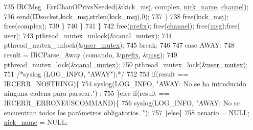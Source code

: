 \begin{DoxyCode}
{{{{{{{{{{735                                                         IRCMsg\_ErrChanOPrivsNeeded(&kick\_msj, complex, 
      \hyperlink{_g-2361-06-_p1-_server_8c_aabbf66718cda228b924a4a9441eadf62}{nick\_name}, \hyperlink{_g-2361-06-_p1-_server_8c_a842ca2f026578e5c479c095ff3335969}{channel});
736                                                         send(IDsocket,kick\_msj,strlen(kick\_msj),0);
737                                                 \}
738                                                 free(kick\_msj); free(complex);
739                                         \}
740                                 \}
741                         \}
742                         free(\hyperlink{_g-2361-06-_p1-_server_8c_ad2849cf781a4db22cc1b31eaaee50a4f}{prefix}); free(\hyperlink{_g-2361-06-_p1-_server_8c_a842ca2f026578e5c479c095ff3335969}{channel}); free(\hyperlink{_g-2361-06-_p1-_server_8c_a32d2f5216cddb59c7cc8fb2806a7e727}{msg});free(
      \hyperlink{_g-2361-06-_p1-_server_8c_a14871705f45ccdc5bb9f4549efd8e119}{user});
743                         pthread\_mutex\_unlock(&\hyperlink{_g-2361-06-_p1-_server_8c_ab86a544a49de18195048bac54dd3ac3e}{canal\_mutex});
744                         pthread\_mutex\_unlock(&\hyperlink{_g-2361-06-_p1-_server_8c_a5dedd07a1144d2ab70b74a8e64b6a7c0}{user\_mutex});
745                         \textcolor{keywordflow}{break};
746 
747                 \textcolor{keywordflow}{case} AWAY:
748                         result = IRCParse\_Away (comando, &\hyperlink{_g-2361-06-_p1-_server_8c_ad2849cf781a4db22cc1b31eaaee50a4f}{prefix}, &\hyperlink{_g-2361-06-_p1-_server_8c_a32d2f5216cddb59c7cc8fb2806a7e727}{msg});
749                         pthread\_mutex\_lock(&\hyperlink{_g-2361-06-_p1-_server_8c_ab86a544a49de18195048bac54dd3ac3e}{canal\_mutex});
750                         pthread\_mutex\_lock(&\hyperlink{_g-2361-06-_p1-_server_8c_a5dedd07a1144d2ab70b74a8e64b6a7c0}{user\_mutex});
751                         \textcolor{comment}{/*syslog (LOG\_INFO, "AWAY");*/}
752 
753                         \textcolor{keywordflow}{if}(result == IRCERR\_NOSTRING)\{
754                                 syslog(LOG\_INFO, \textcolor{stringliteral}{"AWAY: No se ha introducido ninguna cadena para parsear."})
      ;
755                         \}\textcolor{keywordflow}{else} \textcolor{keywordflow}{if}(result == IRCERR\_ERRONEUSCOMMAND)\{
756                                 syslog(LOG\_INFO, \textcolor{stringliteral}{"AWAY: No se encuentran todos los parámetros obligatorios.
      "});
757                         \}\textcolor{keywordflow}{else}\{
758                                 \hyperlink{_g-2361-06-_p1-_server_8c_a0147a5b81499984f9cb00379a8cb84af}{usuario} = NULL; \hyperlink{_g-2361-06-_p1-_server_8c_aabbf66718cda228b924a4a9441eadf62}{nick\_name} = NULL; 
}}}}}}}}}}
\end{DoxyCode}
